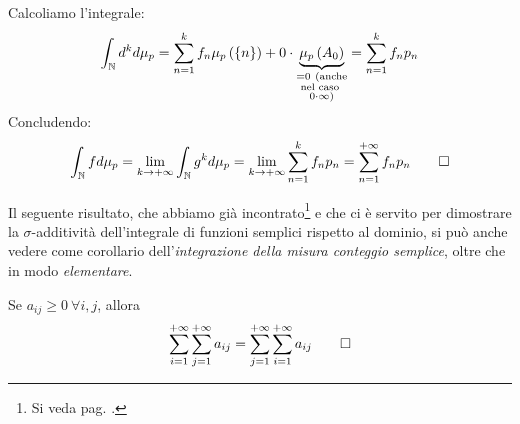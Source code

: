 \begin{demonstration}
\begin{equation*}
\end{equation*}
Calcoliamo l'integrale:
\begin{equation*}
	\int_{\mathbb{N}}d^kd\mu_p=\sum_{n=1}^{k}f_n\mu_p\left(\left\{n\right\}\right)+0\cdot \underbrace{\mu_p\left(A_0\right)}_{\substack{=0\ (\text{anche} \\ \text{nel caso } \\ 0\cdot \infty)}}=\sum_{n=1}^{k}f_np_n
\end{equation*}
Concludendo:
\begin{equation*}
	\int_{\mathbb{N}}fd\mu_p=\lim_{k\to+\infty}\int_{\mathbb{N}}g^kd\mu_p=\lim_{k\to+\infty}\sum_{n=1}^{k}f_np_n=\sum_{n=1}^{+\infty}f_np_n\qedhere
\end{equation*}
\end{demonstration}
Il seguente risultato, che abbiamo già incontrato\footnote{Si veda pag. \pageref{commutativitàindici}.} e che ci è servito per dimostrare la $\sigma$-additività dell'integrale di funzioni semplici rispetto al dominio, si può anche vedere come corollario dell'\textit{integrazione della misura conteggio semplice}, oltre che in modo \textit{elementare}. 
\begin{corollaryqed}
	Se $a_{ij}\geq0\ \forall i,j$, allora
	\begin{equation*}
		\sum_{i=1}^{+\infty}\sum_{j=1}^{+\infty}a_{ij}=\sum_{j=1}^{+\infty}\sum_{i=1}^{+\infty}a_{ij}\qedhere
	\end{equation*}
\end{corollaryqed}
